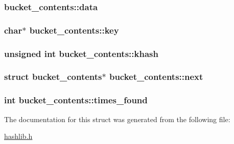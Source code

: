 \subsubsection[{\texorpdfstring{data}{data}}]{ bucket\+\_\+contents\+::data}\hypertarget{structbucket__contents_a4e30edeb29dde704f0fcf69bc4c73b4c}{}\label{structbucket__contents_a4e30edeb29dde704f0fcf69bc4c73b4c}
\subsubsection[{\texorpdfstring{key}{key}}]{\setlength{\rightskip}{0pt plus 5cm}char$\ast$ bucket\+\_\+contents\+::key}\hypertarget{structbucket__contents_a17facbf14d154f264ffb2d80b55a2e45}{}\label{structbucket__contents_a17facbf14d154f264ffb2d80b55a2e45}
\subsubsection[{\texorpdfstring{khash}{khash}}]{\setlength{\rightskip}{0pt plus 5cm}unsigned int bucket\+\_\+contents\+::khash}\hypertarget{structbucket__contents_a8c8862e218acedb6bf4295849b9bab32}{}\label{structbucket__contents_a8c8862e218acedb6bf4295849b9bab32}
\subsubsection[{\texorpdfstring{next}{next}}]{\setlength{\rightskip}{0pt plus 5cm}struct {\bf bucket\+\_\+contents}$\ast$ bucket\+\_\+contents\+::next}\hypertarget{structbucket__contents_a626ac20a4ec314e2028fd964ec63551e}{}\label{structbucket__contents_a626ac20a4ec314e2028fd964ec63551e}
\subsubsection[{\texorpdfstring{times\+\_\+found}{times_found}}]{\setlength{\rightskip}{0pt plus 5cm}int bucket\+\_\+contents\+::times\+\_\+found}\hypertarget{structbucket__contents_a6dba923dd1c449e85201c91607a43ce0}{}\label{structbucket__contents_a6dba923dd1c449e85201c91607a43ce0}


The documentation for this struct was generated from the following file\+:\begin{DoxyCompactItemize}
\item 
\hyperlink{hashlib_8h}{hashlib.\+h}\end{DoxyCompactItemize}
